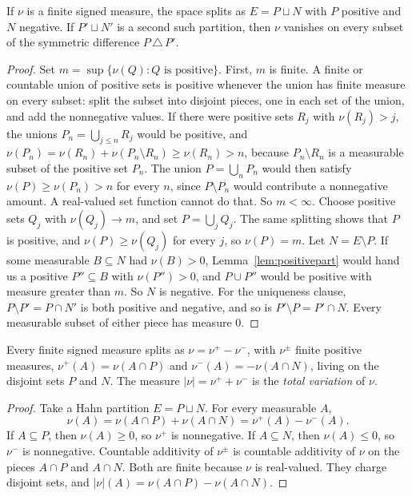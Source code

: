 \begin{theorem}\label{thm:hahn}
If $\nu$ is a finite signed measure, the space splits as $E=P\sqcup N$ with $P$ positive and $N$ negative. If $P'\sqcup N'$ is a second such partition, then $\nu$ vanishes on every subset of the symmetric difference $P\,\triangle\,P'$.
\end{theorem}
\begin{proof}
Set $m=\sup\{\nu(Q):Q\text{ is positive}\}$. First, $m$ is finite. A finite or countable union of positive sets is positive whenever the union has finite measure on every subset: split the subset into disjoint pieces, one in each set of the union, and add the nonnegative values. If there were positive sets $R_j$ with $\nu(R_j)>j$, the unions $P_n=\bigcup_{j\le n}R_j$ would be positive, and $\nu(P_n)=\nu(R_n)+\nu(P_n\setminus R_n)\ge\nu(R_n)>n$, because $P_n\setminus R_n$ is a measurable subset of the positive set $P_n$. The union $P=\bigcup_nP_n$ would then satisfy $\nu(P)\ge\nu(P_n)>n$ for every $n$, since $P\setminus P_n$ would contribute a nonnegative amount. A real-valued set function cannot do that. So $m<\infty$. Choose positive sets $Q_j$ with $\nu(Q_j)\to m$, and set $P=\bigcup_jQ_j$. The same splitting shows that $P$ is positive, and $\nu(P)\ge\nu(Q_j)$ for every $j$, so $\nu(P)=m$. Let $N=E\setminus P$. If some measurable $B\subseteq N$ had $\nu(B)>0$, Lemma~\ref{lem:positivepart} would hand us a positive $P''\subseteq B$ with $\nu(P'')>0$, and $P\cup P''$ would be positive with measure greater than $m$. So $N$ is negative. For the uniqueness clause, $P\setminus P'=P\cap N'$ is both positive and negative, and so is $P'\setminus P=P'\cap N$. Every measurable subset of either piece has measure $0$.
\end{proof}

\begin{corollary}\label{cor:jordan}
Every finite signed measure splits as $\nu=\nu^+-\nu^-$, with $\nu^\pm$ finite positive measures, $\nu^+(A)=\nu(A\cap P)$ and $\nu^-(A)=-\nu(A\cap N)$, living on the disjoint sets $P$ and $N$. The measure
$|\nu|=\nu^++\nu^-$ is the \emph{total variation} of $\nu$.
\end{corollary}
\begin{proof}
Take a Hahn partition $E=P\sqcup N$. For every measurable $A$,
\[
\nu(A)=\nu(A\cap P)+\nu(A\cap N)=\nu^+(A)-\nu^-(A).
\]
If $A\subseteq P$, then $\nu(A)\ge0$, so $\nu^+$ is nonnegative. If $A\subseteq N$, then $\nu(A)\le0$, so $\nu^-$ is nonnegative. Countable additivity of $\nu^\pm$ is countable additivity of $\nu$ on the pieces $A\cap P$ and $A\cap N$. Both are finite because $\nu$ is real-valued. They charge disjoint sets, and $|\nu|(A)=\nu(A\cap P)-\nu(A\cap N)$.
\end{proof}


